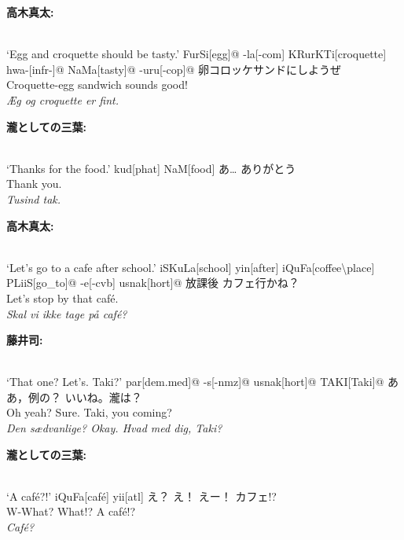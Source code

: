 \begin{paracol}{2}
\bigskip
\switchcolumn*
\hfill \textbf{高木真太:}

\switchcolumn

\exdisplay[lingstyle=Conversation]
\begingl 
\glpreamble
\textbf{}\\
`Egg and croquette should be tasty.'
\endpreamble
FurSi[egg]@
-la[\sc -com]
KRurKTi[croquette]
hwa-[\sc infr-]@
NaMa[tasty]@
-uru[\sc -cop]@
\glft
卵コロッケサンドにしようぜ\\
Croquette-egg sandwich sounds good!\\
\textit{Æg og croquette er fint.}
\endgl
\xe

\bigskip
\switchcolumn*
\hfill \textbf{瀧としての三葉:}

\switchcolumn

\exdisplay[lingstyle=Conversation]
\begingl 
\glpreamble
\textbf{}\\
`Thanks for the food.'
\endpreamble
kud[\sc phat]
NaM[food]
\glft
あ… ありがとう\\
Thank you.\\
\textit{Tusind tak.}
\endgl
\xe

\bigskip
\switchcolumn*
\hfill \textbf{高木真太:}

\switchcolumn

\exdisplay[lingstyle=Conversation]
\begingl 
\glpreamble
\textbf{}\\
`Let's go to a cafe after school.'
\endpreamble
iSKuLa[school]
yin[after]
iQuFa[coffee\textbackslash place]
PLiiS[go\_to]@
-e\lilglot{}[\sc -cvb]
usnak[\sc hort]@
\glft
放課後 カフェ行かね？\\
Let's stop by that café.\\
\textit{Skal vi ikke tage på café?}
\endgl
\xe

\bigskip
\switchcolumn*
\hfill \textbf{藤井司:}

\switchcolumn

\exdisplay[lingstyle=Conversation]
\begingl 
\glpreamble
\textbf{}\\
`That one? Let's. Taki?'
\endpreamble
par[\sc dem.med]@
-s[\sc -nmz]@
usnak[\sc hort]@
\textrm{T}AKI[Taki]@
\glft
ああ，例の？ いいね。瀧は？\\
Oh yeah? Sure. Taki, you coming?\\
\textit{Den sædvanlige? Okay. Hvad med dig, Taki?}
\endgl
\xe

\bigskip
\switchcolumn*
\hfill \textbf{瀧としての三葉:}

\switchcolumn

\exdisplay[lingstyle=Conversation]
\begingl 
\glpreamble
\textbf{}\\
`A café?!'
\endpreamble
iQuFa[café]
yii[\sc atl]
\glft
え？ え！ えー！ カフェ!?\\
W-What? What!? A café!?\\
\textit{Café?}
\endgl
\xe

\end{paracol}



